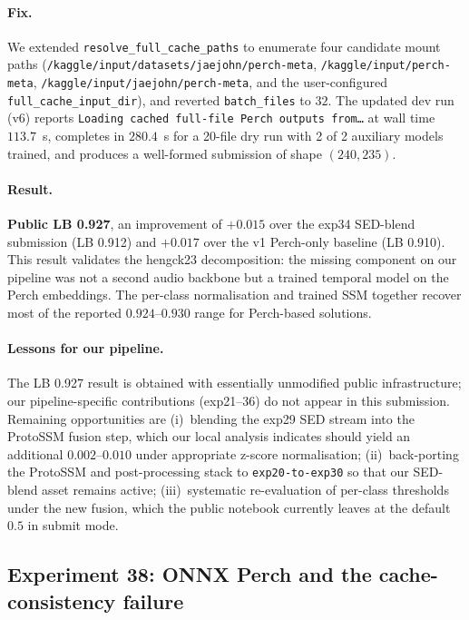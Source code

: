 \paragraph{Fix.}
We extended \texttt{resolve\_full\_cache\_paths} to enumerate four
candidate mount paths
(\texttt{/kaggle/input/datasets/jaejohn/perch-meta},
\texttt{/kaggle/input/perch-meta},
\texttt{/kaggle/input/jaejohn/perch-meta}, and the user-configured
\texttt{full\_cache\_input\_dir}), and reverted \texttt{batch\_files}
to $32$. The updated dev run (v6) reports
\texttt{Loading cached full-file Perch outputs from\dots} at wall time
$113.7$~s, completes in $280.4$~s for a 20-file dry run with 2 of 2
auxiliary models trained, and produces a well-formed submission of
shape $(240, 235)$.

\paragraph{Result.}
\textbf{Public LB 0.927}, an improvement of $+0.015$ over the exp34
SED-blend submission (LB 0.912) and $+0.017$ over the v1 Perch-only
baseline (LB 0.910). This result validates the hengck23 decomposition:
the missing component on our pipeline was not a second audio backbone
but a trained temporal model on the Perch embeddings. The per-class
normalisation and trained SSM together recover most of the reported
$0.924$--$0.930$ range for Perch-based solutions.

\paragraph{Lessons for our pipeline.}
The LB 0.927 result is obtained with essentially unmodified public
infrastructure; our pipeline-specific contributions (exp21--36) do
not appear in this submission. Remaining opportunities are
(i)~blending the exp29 SED stream into the ProtoSSM fusion step,
which our local analysis indicates should yield an additional
$0.002$--$0.010$ under appropriate z-score normalisation;
(ii)~back-porting the ProtoSSM and post-processing stack to
\texttt{exp20-to-exp30} so that our SED-blend asset remains active;
(iii)~systematic re-evaluation of per-class thresholds under the
new fusion, which the public notebook currently leaves at the
default $0.5$ in submit mode.

\subsection{Experiment 38: ONNX Perch and the cache-consistency failure}

